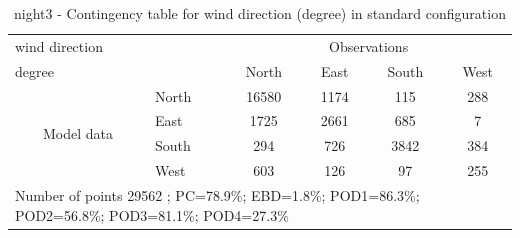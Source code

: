 \begin{table}[p!]
\begin{center}
\begin{tabular}{llcccc}
\hline
{wind direction}                                       &                             &    \multicolumn{4}{c}{Observations}                 \\
{degree}                                       &                             & {North}   & {East} & {South} & {West} \\
\hline
\multicolumn{1}{c}{\multirow{4}{*}{Model data}}  & {North}                    & 16580   & 1174    & 115     & 288\\
                                                 & {East}                     & 1725   & 2661    & 685     & 7\\
                                                 & {South}                    & 294   & 726   & 3842    & 384\\
                                                 & {West}                     & 603  & 126   & 97    & 255\\
\hline 
\multicolumn{6}{l}{ Number of points        29562 ; PC=78.9\%; EBD=1.8\%; POD1=86.3\%; POD2=56.8\%; POD3=81.1\%; POD4=27.3\%}                 \\
\end{tabular}
\end{center}
\caption{night3 - Contingency table for {wind direction} (degree) in standard configuration}
\label{tab:contingencywdBEF:night3}
\end{table}
